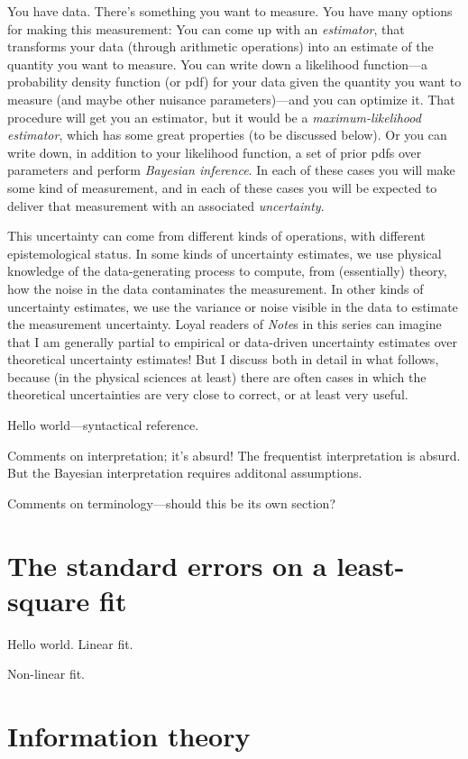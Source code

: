 \documentclass[12pt, letterpaper]{article}
\newcommand{\documentname}{\textsl{Note}}
\begin{document}
You have data. There's something you want to measure. You have many
options for making this measurement: You can come up with an
\textsl{estimator}, that transforms your data (through arithmetic
operations) into an estimate of the quantity you want to measure. You
can write down a likelihood function---a probability density function
(or pdf) for your data given the quantity you want to measure (and
maybe other nuisance parameters)---and you can optimize it. That
procedure will get you an estimator, but it would be a
\textsl{maximum-likelihood estimator}, which has some great
properties (to be discussed below).
Or you can write down, in addition to your likelihood
function, a set of prior pdfs over parameters and perform
\textsl{Bayesian inference}.  In each of these cases you will make
some kind of measurement, and in each of these cases you will be
expected to deliver that measurement with an associated \textsl{uncertainty}.

This uncertainty can come from different kinds of operations, with
different epistemological status. In some kinds of uncertainty
estimates, we use physical knowledge of the data-generating process to
compute, from (essentially) theory, how the noise in the data
contaminates the measurement. In other kinds of uncertainty estimates,
we use the variance or noise visible in the data to estimate the measurement
uncertainty. Loyal readers of \documentname s in this series can imagine that
I am generally partial to empirical or data-driven uncertainty estimates over
theoretical uncertainty estimates! But I discuss both in detail in what follows,
because (in the physical sciences at least) there are often cases in which the
theoretical uncertainties are very close to correct, or at least very useful.

Hello world---syntactical reference.

Comments on interpretation; it's absurd! The frequentist interpretation is
absurd. But the Bayesian interpretation requires additonal assumptions.

Comments on terminology---should this be its own section?

\section{The standard errors on a least-square fit}

Hello world. Linear fit.

Non-linear fit.

\section{Information theory}
\end{document}
